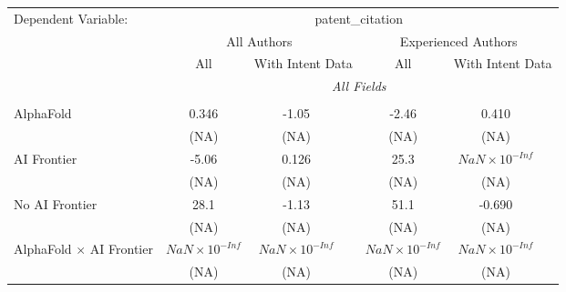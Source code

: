 \begingroup
\centering
\begin{tabular}{lcccccc}
   \tabularnewline \midrule \midrule
   Dependent Variable: & \multicolumn{6}{c}{patent\_citation}\\
 & \multicolumn{3}{c}{All Authors} & \multicolumn{3}{c}{Experienced Authors} \\
\cmidrule(lr){2-4} \cmidrule(lr){5-7}
 & \multicolumn{1}{c}{All} & \multicolumn{2}{c}{With Intent Data} & \multicolumn{1}{c}{All} & \multicolumn{2}{c}{With Intent Data} \\
\cmidrule(lr){2-2} \cmidrule(lr){3-4} \cmidrule(lr){5-5} \cmidrule(lr){6-7}
 & \multicolumn{6}{c}{\textit{All Fields}} \\ \\
   AlphaFold                                                                  & 0.346                  & -1.05                  &                        & -2.46                  & 0.410                  &   \\   
                                                                              & (NA)                   & (NA)                   &                        & (NA)                   & (NA)                   &   \\   
   AI Frontier                                                                & -5.06                  & 0.126                  &                        & 25.3                   & $NaN\times 10^{-Inf}$  &   \\   
                                                                              & (NA)                   & (NA)                   &                        & (NA)                   & (NA)                   &   \\   
   No AI Frontier                                                             & 28.1                   & -1.13                  &                        & 51.1                   & -0.690                 &   \\   
                                                                              & (NA)                   & (NA)                   &                        & (NA)                   & (NA)                   &   \\   
   AlphaFold $\times$ AI Frontier                                             & $NaN\times 10^{-Inf}$  & $NaN\times 10^{-Inf}$  &                        & $NaN\times 10^{-Inf}$  & $NaN\times 10^{-Inf}$  &   \\   
                                                                              & (NA)                   & (NA)                   &                        & (NA)                   & (NA)                   &   \\   

\end{tabular}
